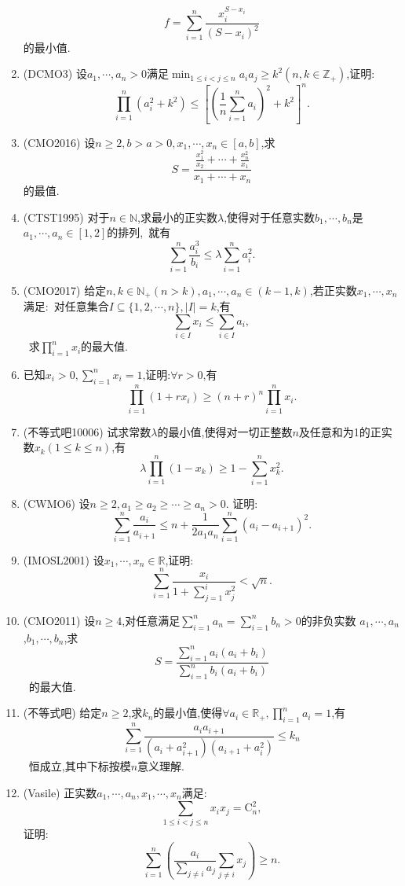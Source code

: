 \documentclass{article}
\begin{document}
\begin{enumerate}
            $$f=\sum_{i=1}^n{\frac{x_i^{S-x_i}}{(S-x_i)^2}}$$的最小值.
        \item (DCMO3) 设$a_1,\cdots,a_n>0$满足$\min_{1\le i<j \le n}a_ia_j\geq k^2 (n,k\in\mathbb{Z}_{+})$,证明:\ 
            $$\prod_{i=1}^n{\left( a_i^2 + k^2 \right)}\leq{\left[ {\left( \frac{1}{n}\sum_{i=1}^n{a_i} \right)}^2 + k^2 \right]}^n.$$
        \item (CMO2016) 设$n\geq2,b>a>0,x_1,\cdots,x_n\in[a,b]$,求\ 
            $$S=\frac{\frac{x_1^2}{x_2}+\cdots+\frac{x_n^2}{x_1}}{x_1+\cdots+x_n}$$的最值.
        \item (CTST1995) 对于$n\in\mathbb{N}$,求最小的正实数$\lambda$,使得对于任意实数$b_1,\cdots,b_n$是$a_1,\cdots,a_n\in[1,2]$的排列,\
            就有$$\sum_{i=1}^n{\frac{a_i^3}{b_i}}\leq\lambda\sum_{i=1}^n{a_i^2}.$$
        \item (CMO2017) 给定$n,k\in\mathbb{N}_{+}(n>k),a_1,\cdots,a_n\in(k-1,k)$,若正实数$x_1,\cdots,x_n$满足:\ 
            对任意集合$I\subseteq\{ 1,2,\cdots,n \},\mid I \mid=k$,有$$\sum_{i\in I}{x_i}\leq\sum_{i\in I}{a_i},$$\ 
            求$\prod_{i=1}^n{x_i}$的最大值.
        \item 已知$x_i>0,\sum_{i=1}^n{x_i}=1$,证明:$\forall r>0$,有
            $$\prod_{i=1}^n(1+rx_i)\geq(n+r)^n\prod_{i=1}^n{x_i}.$$
        \item (不等式吧10006) 试求常数$\lambda$的最小值,使得对一切正整数$n$及任意和为1的正实数$x_k(1\le k \le n)$,有\ 
            $$\lambda\prod_{i=1}^n{(1-x_k)}\geq 1-\sum_{i=1}^n{x_k^2}.$$
        \item (CWMO6) 设$n\ge2,a_1\ge a_2\ge\cdots\ge a_n>0$. 证明:\
            $$\sum_{i=1}^n{\frac{a_i}{a_{i+1}}}\leq n+\frac{1}{2a_1a_n}\sum_{i=1}^n{\left( a_i - a_{i+1} \right)}^2.$$
        \item (IMOSL2001) 设$x_1,\cdots,x_n\in\mathbb{R}$,证明:\ 
            $$\sum_{i=1}^n{\frac{x_i}{1+\sum_{j=1}^i{x_j^2}}}<\sqrt{n}.$$
        \item (CMO2011) 设$n\geq4$,对任意满足$\sum_{i=1}^n{a_n}=\sum_{i=1}^n{b_n}>0$的非负实数 
            $a_1,\cdots,a_n$,$b_1,\cdots,b_n$,求$$S=\frac{\sum_{i=1}^n{a_i(a_i+b_i)}}{\sum_{i=1}^n{b_i(a_i+b_i)}}$$\ 
            的最大值.
        \item (不等式吧) 给定$n\geq2$,求$k_n$的最小值,使得$\forall a_i\in\mathbb{R}_{+},\prod_{i=1}^n{a_i}=1$,有\ 
            $$\sum_{i=1}^n{\frac{a_ia_{i+1}}{{\left( a_i + a_{i+1}^2\right)}{\left( a_{i+1} + a_{i}^2\right)}}}\leq k_n$$\ 
            恒成立,其中下标按模$n$意义理解.
        \item (Vasile) 正实数$a_1,\cdots,a_n,x_1,\cdots,x_n$满足:$$\sum_{1\leq i<j \leq n}{x_ix_j}=\text{C}_n^2,$$证明:\ 
            $$\sum_{i=1}^n{\left( \frac{a_i}{\sum_{j\neq i}{a_j}}\sum_{j\neq i}{x_j}\right)}\geq n.$$
    \end{enumerate}
\end{document}
